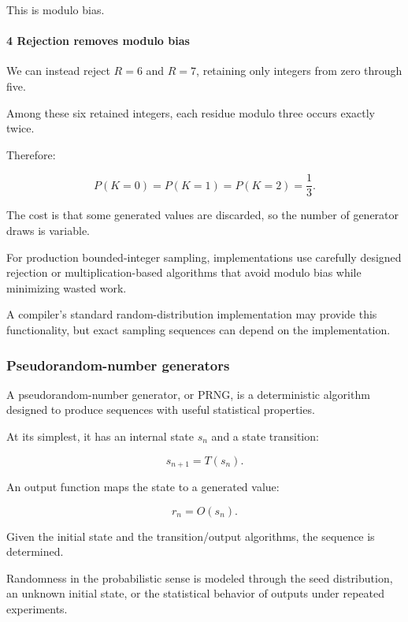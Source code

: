 This is modulo bias.

\paragraph{4 Rejection removes modulo bias}\label{02-foundations-ii-ch029-rejection-removes-modulo-bias}

\hypertarget{02-foundations-ii-ch029-rejection-removes-modulo-bias}{}

We can instead reject \(R=6\) and \(R=7\), retaining only integers from zero through five.

Among these six retained integers, each residue modulo three occurs exactly twice.

Therefore:

\[
 P(K=0)=P(K=1)=P(K=2)=\frac13.
\]

The cost is that some generated values are discarded, so the number of generator draws is variable.

For production bounded-integer sampling, implementations use carefully designed rejection or multiplication-based algorithms that avoid modulo bias while minimizing wasted work.

A compiler's standard random-distribution implementation may provide this functionality, but exact sampling sequences can depend on the implementation.

\subsubsection{Pseudorandom-number generators}\label{02-foundations-ii-ch029-pseudorandom-number-generators}

\hypertarget{02-foundations-ii-ch029-pseudorandom-number-generators}{}

A pseudorandom-number generator, or PRNG, is a deterministic algorithm designed to produce sequences with useful statistical properties.

At its simplest, it has an internal state \(s_n\) and a state transition:

\[
 \boxed{s_{n+1}=T(s_n)}.
\]

An output function maps the state to a generated value:

\[
 \boxed{r_n=O(s_n)}.
\]

Given the initial state and the transition/output algorithms, the sequence is determined.

Randomness in the probabilistic sense is modeled through the seed distribution, an unknown initial state, or the statistical behavior of outputs under repeated experiments.

